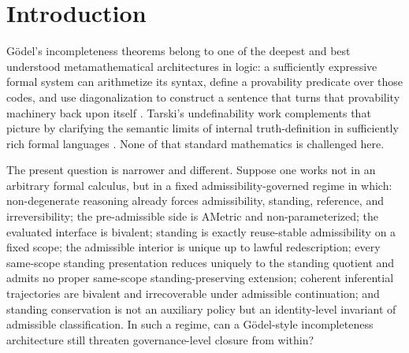 \documentclass[11pt]{article}
\theoremstyle{plain}
\theoremstyle{definition}
\begin{document}
\begin{abstract}
instantiated; proves that semantic, infinitary, and extension rescue routes are finitely exhausted; and concludes that a G\"odel architecture threatening governance-level closure is not instantiable in the unique admissible interior. Corollaries exclude any same-domain admissibility-relevant ``true but unprovable'' split and protect governance-certified results against incompleteness objections formulated within the same meaningful regime.

The complete theorem chain of the present manuscript has also been mechanized in Lean4. The formal development assumes the same primitive floor used in the paper rather than attempting to generate it from below, and every exported paper-facing theorem corresponding to the present manuscript's theorem chain is verified to be axiom-free.
\end{abstract}

\tableofcontents

\section{Introduction}

G\"odel's incompleteness theorems belong to one of the deepest and best understood metamathematical architectures in logic: a sufficiently expressive formal system can arithmetize its syntax, define a provability predicate over those codes, and use diagonalization to construct a sentence that turns that provability machinery back upon itself \citep{Goedel1931}. Tarski's undefinability work complements that picture by clarifying the semantic limits of internal truth-definition in sufficiently rich formal languages \citep{Tarski1936,Tarski1956}. None of that standard mathematics is challenged here.

The present question is narrower and different. Suppose one works not in an arbitrary formal calculus, but in a fixed admissibility-governed regime in which: non-degenerate reasoning already forces admissibility, standing, reference, and irreversibility; the pre-admissible side is AMetric and non-parameterized; the evaluated interface is bivalent; standing is exactly reuse-stable admissibility on a fixed scope; the admissible interior is unique up to lawful redescription; every same-scope standing presentation reduces uniquely to the standing quotient and admits no proper same-scope standing-preserving extension; coherent inferential trajectories are bivalent and irrecoverable under admissible continuation; and standing conservation is not an auxiliary policy but an identity-level invariant of admissible classification. In such a regime, can a G\"odel-style incompleteness architecture still threaten governance-level closure from within?
\end{document}
